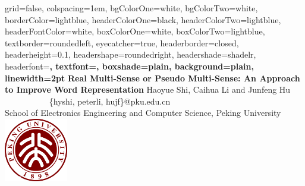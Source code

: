 \documentclass[landscape,final,b0paper,fontscale=0.285]{baposter}
\begin{document}
\begin{poster}%
  {
  grid=false,
  colspacing=1em,
  bgColorOne=white,
  bgColorTwo=white,
  borderColor=lightblue,
  headerColorOne=black,
  headerColorTwo=lightblue,
  headerFontColor=white,
  boxColorOne=white,
  boxColorTwo=lightblue,
  textborder=roundedleft,
  eyecatcher=true,
  headerborder=closed,
  headerheight=0.1\textheight,
  headershape=roundedright,
  headershade=shadelr,
  headerfont=\Large\bf\textsc, %
  textfont={\setlength{\parindent}{1em}},
  boxshade=plain,
  background=plain,
  linewidth=2pt
  }
  {}
  {\bf{Real Multi-Sense or Pseudo Multi-Sense: An Approach to Improve Word Representation}\vspace{0.1em}}
  {{Haoyue Shi, Caihua Li and Junfeng Hu} ~~~~~~~~~~  \{hyshi, peterli, hujf\}@pku.edu.cn \\[0.1em] {School of Electronics Engineering and Computer Science, Peking University}}
  {%
    \includegraphics[height=7.5em]{images/logo}
  }
    \newcommand{\colouredcircle}{%
      \tikz{\useasboundingbox (-0.2em,-0.32em) rectangle(0.2em,0.32em); \draw[draw=black,fill=lightblue,line width=0.03em] (0,0) circle(0.18em);}}


\end{poster}
\end{document}
